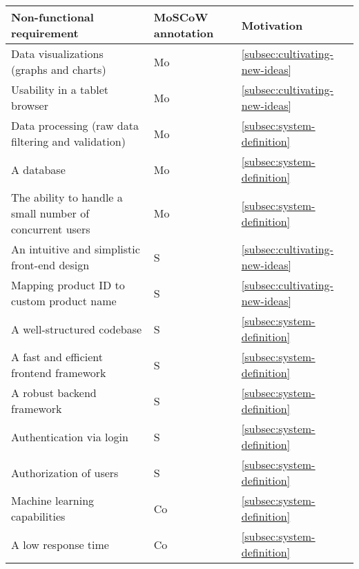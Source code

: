 \begin{table}[H]
    \begin{tabularx}{\textwidth}{ l X X }
        \toprule
        \textbf{Non-functional requirement}
        & \textbf{MoSCoW annotation}
        & \textbf{Motivation}
        \\ \midrule
        Data visualizations (graphs and charts)
        & Mo
        & {\ul{\ref{subsec:cultivating-new-ideas}}}
        \\ \midrule
        Usability in a tablet browser
        & Mo
        & {\ul{\ref{subsec:cultivating-new-ideas}}}
        \\ \midrule
        Data processing (raw data filtering and validation)
        & Mo
        & {\ul{\ref{subsec:system-definition}}}
        \\ \midrule
        A database
        & Mo
        & {\ul{\ref{subsec:system-definition}}}
        \\ \midrule
        The ability to handle a small number of concurrent users
        & Mo
        & {\ul{\ref{subsec:system-definition}}}
        \\ \midrule
        An intuitive and simplistic front-end design
        & S
        & {\ul{\ref{subsec:cultivating-new-ideas}}}
        \\ \midrule
        Mapping product ID to custom product name
        & S
        & {\ul{\ref{subsec:cultivating-new-ideas}}}
        \\ \midrule
        A well-structured codebase
        & S
        & {\ul{\ref{subsec:system-definition}}}
        \\ \midrule
        A fast and efficient frontend framework
        & S
        & {\ul{\ref{subsec:system-definition}}}
        \\ \midrule
        A robust backend framework
        & S
        & {\ul{\ref{subsec:system-definition}}}
        \\ \midrule
        Authentication via login
        & S
        & {\ul{\ref{subsec:system-definition}}}
        \\ \midrule
        Authorization of users
        & S
        & {\ul{\ref{subsec:system-definition}}}
        \\ \midrule
        Machine learning capabilities
        & Co
        & {\ul{\ref{subsec:system-definition}}}
        \\ \midrule
        A low response time
        & Co
        & {\ul{\ref{subsec:system-definition}}}
        \\ \midrule

\end{tabularx}
\end{table}

